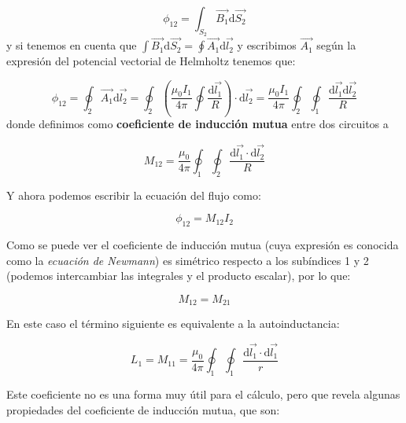 \documentclass[12pt]{article}
\newcommand{\parentesis}[1]{\left( #1  \right)}
\newcommand{\D}{\mathrm{d}}
\begin{document}
\begin{equation}
\phi_{12} = \int_{S_2} \vec{B_1} \D \vec{S_2}
\end{equation}
y si tenemos en cuenta que $\int \vec{B_1} \D \vec{S_2} = \oint \vec{A_1} \D \vec{l_2}$ y escribimos $\vec{A_1}$ según la expresión del potencial vectorial de Helmholtz tenemos que:

\begin{equation}
\phi_{12} = \oint_2 \vec{A_1} \D \vec{l_2} = \oint_2 \parentesis{\dfrac{\mu_0 I_1}{4 \pi} \oint \dfrac{\D \vec{l_1}}{R}} \cdot \D \vec{l_2} = \dfrac{\mu_0 I_1}{4 \pi} \oint_2 \oint_1 \dfrac{\D \vec{l_1} \D \vec{l_2}}{R}
\end{equation}
donde definimos como \textbf{coeficiente de inducción mutua} entre dos circuitos a

\begin{equation}
M_{12} = \dfrac{\mu_0}{4 \pi} \oint_1 \oint_2 \dfrac{\D \vec{l_1} \cdot \D \vec{l_2}}{R}
\end{equation}

Y ahora podemos escribir la ecuación del flujo como:

\begin{equation}
\phi_{12} = M_{12} I_2
\end{equation}

Como se puede ver el coeficiente de inducción mutua (cuya expresión es conocida como la \textit{ecuación de Newmann}) es simétrico respecto a los subíndices 1 y 2 (podemos intercambiar las integrales y el producto escalar), por lo que:

\begin{equation}
M_{12} = M_{21}
\end{equation}

En este caso el término siguiente es equivalente a la autoinductancia:

\begin{equation}
L_1 = M_{11} = \dfrac{\mu_0}{4 \pi} \oint_1 \oint_1 \dfrac{\D \vec{l_1} \cdot \D \vec{l_1} }{r}
\end{equation}

Este coeficiente no es una forma muy útil para el cálculo, pero que revela algunas propiedades del coeficiente de inducción mutua, que son:
\end{document}
